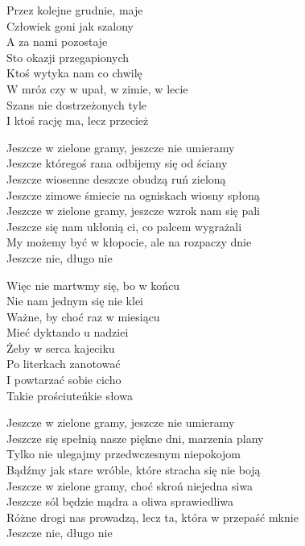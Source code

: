 \begin{text} 
    Przez kolejne grudnie, maje\\ 
    Człowiek goni jak szalony\\
    A za nami pozostaje\\
    Sto okazji przegapionych\\ 
    Ktoś wytyka nam co chwilę\\ 
    W mróz czy w upał, w zimie, w lecie\\
    Szans nie dostrzeżonych tyle\\
    I ktoś rację ma, lecz przecież

    Jeszcze w zielone gramy, jeszcze nie umieramy\\
    Jeszcze któregoś rana odbijemy się od ściany\\
    Jeszcze wiosenne deszcze obudzą ruń zieloną\\
    Jeszcze zimowe śmiecie na ogniskach wiosny spłoną\\
    Jeszcze w zielone gramy, jeszcze wzrok nam się pali\\
    Jeszcze się nam ukłonią ci, co palcem wygrażali\\
    My możemy być w kłopocie, ale na rozpaczy dnie\\ 
    Jeszcze nie, długo nie

    Więc nie martwmy się, bo w końcu\\
    Nie nam jednym się nie klei\\
    Ważne, by choć raz w miesiącu\\ 
    Mieć dyktando u nadziei\\
    Żeby w serca kajeciku\\
    Po literkach zanotować\\
    I powtarzać sobie cicho\\
    Takie prościuteńkie słowa

    Jeszcze w zielone gramy, jeszcze nie umieramy\\
    Jeszcze się spełnią nasze piękne dni, marzenia plany\\ 
    Tylko nie ulegajmy przedwczesnym niepokojom\\
    Bądźmy jak stare wróble, które stracha się nie boją\\ 
    Jeszcze w zielone gramy, choć skroń niejedna siwa\\
    Jeszcze sól będzie mądra a oliwa sprawiedliwa\\
    Różne drogi nas prowadzą, lecz ta, która w przepaść mknie\\ 
    Jeszcze nie, długo nie


\end{text}
